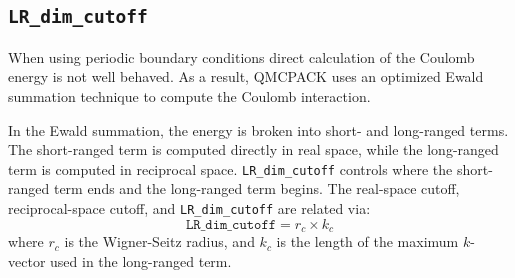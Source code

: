 \subsection{\texttt{LR\_dim\_cutoff}}
When using periodic boundary conditions direct calculation of the Coulomb energy is
not well behaved. As a result, QMCPACK uses an optimized Ewald summation technique
to compute the Coulomb interaction. %

In the Ewald summation, the energy is broken into short- and long-ranged terms.
The short-ranged term is computed directly in real space, while the long-ranged term is computed in reciprocal space.
\texttt{LR\_dim\_cutoff} controls where the short-ranged term ends and the long-ranged term begins.
The real-space cutoff, reciprocal-space cutoff, and \texttt{LR\_dim\_cutoff} are related via:
\[
\texttt{LR\_dim\_cutoff} = r_{c} \times k_{c}
\]
where $r_{c}$ is the Wigner-Seitz radius, and $k_{c}$ is the length of the maximum $k$-vector used in the long-ranged term.
